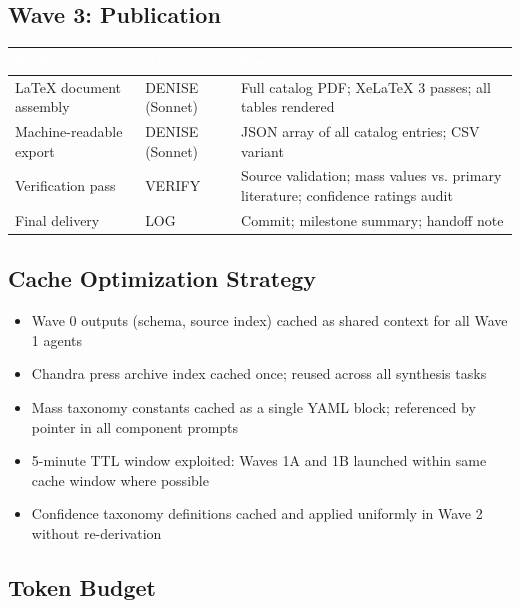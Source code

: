 \documentclass[11pt,letterpaper]{article}
\newcommand{\tableheader}[1]{\textbf{\sffamily\textcolor{white}{#1}}}
\begin{document}
\subsection{Wave 3: Publication}

\begin{center}
\begin{tabularx}{\textwidth}{L{3.5cm}L{2.5cm}X}
\toprule
{}
\tableheader{Task} & \tableheader{Agent} & \tableheader{Spec} \\
\midrule
LaTeX document assembly & DENISE (Sonnet) & Full catalog PDF; XeLaTeX 3 passes; all tables rendered \\
Machine-readable export & DENISE (Sonnet) & JSON array of all catalog entries; CSV variant \\
Verification pass & VERIFY & Source validation; mass values vs. primary literature; confidence ratings audit \\
Final delivery & LOG & Commit; milestone summary; handoff note \\
\bottomrule
\end{tabularx}
\end{center}

\subsection{Cache Optimization Strategy}

\begin{itemize}[leftmargin=1.5em]
  \item Wave 0 outputs (schema, source index) cached as shared context for all Wave 1 agents
  \item Chandra press archive index cached once; reused across all synthesis tasks
  \item Mass taxonomy constants cached as a single YAML block; referenced by pointer in all component prompts
  \item 5-minute TTL window exploited: Waves 1A and 1B launched within same cache window where possible
  \item Confidence taxonomy definitions cached and applied uniformly in Wave 2 without re-derivation
\end{itemize}

\subsection{Token Budget}
\end{document}
